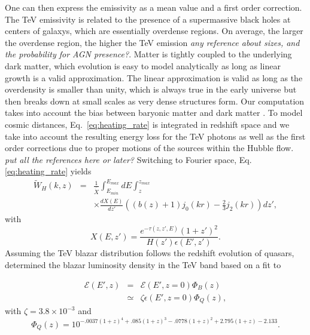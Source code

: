 \documentclass[twocolumns]{emulateapj}
\begin{document}
One can then express the emissivity as a mean value and a first order correction. The TeV emissivity is related to the presence of a supermassive black holes at centers of galaxys, which are essentially  overdense regions. On average, the larger the overdense region, the higher the TeV emission \textit{any reference about sizes, and the probability for AGN presence?}.  Matter is tightly coupled to the underlying dark matter, which evolution is easy to model analytically as long as linear growth is a valid approximation.  The linear approximation is valid as long as the overdensity is smaller than unity, which is always true in the early universe but then breaks down at small scales as very dense structures form.  Our computation takes into account the bias between baryonic matter and dark matter \citep{1996MNRAS.282..347M}. To model cosmic distances, Eq.~\ref{eq:heating_rate} is integrated in redshift space and we take into account the resulting energy loss for the TeV photons as well as the first order corrections due to proper motions of the sources within the Hubble flow.
\textit{put all the references here or later?}
Switching to Fourier space, Eq.\ref{eq:heating_rate} yields
\begin{eqnarray}
  \label{eq:window}
  \tilde{W}_H(k,z)&=&\frac{1}{\bar{\dot{X}}}\int_{E_{min}}^{E_{max}}dE\int_z^{z_{max}} \\ \nonumber
&&\times \frac{dX(E)}{dz'}\left((b(z)+1)j_0(kr)-\frac{2}{3}j_2(kr)\right)dz', \nonumber
\end{eqnarray}
with 
 \begin{equation}
  \label{eq:define_X}
  X(E,z')=\frac{e^{-\tau(z,z',E)}(1+z')^2}{H(z')\epsilon(E',z')}.
\end{equation}
Assuming the TeV blazar distribution follows the redshift evolution of quasars, \citet{2012ApJ...752...22B} determined the blazar luminosity density in the TeV band based on a fit to \citet{2007ApJ...654..731H}

\begin{eqnarray}
  \label{eq:mean_heat}
  \mathcal{E}(E',z)&=&\mathcal{E}(E',z=0)\Phi_{B}(z)\\ \nonumber
&\simeq& \zeta\epsilon(E',z=0)\Phi_{Q}(z),\nonumber
\end{eqnarray}
with $\zeta=3.8\times 10^{-3}$ and
\begin{equation}
  \label{eq:phi_quasar}
 \Phi_{Q}(z)=10^{-.0037(1+z)^4+.085(1+z)^3-.0778(1+z)^2+2.795(1+z)-2.133}. 
\end{equation}
 
\end{document}
